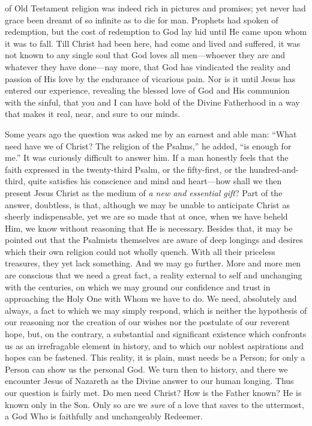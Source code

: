 \documentclass[12pt,a5paper,oneside]{book}
\begin{document}
of Old Testament religion was indeed rich in
pictures and promises; yet never had grace
been dreamt of so infinite as to die for man.
Prophets had spoken of redemption, but the
cost of redemption to God lay hid until He
came upon whom it was to fall. Till Christ
had been here, had come and lived and
suffered, it was not known to any single
soul that God loves all men---whoever
they are and whatever they have done---nay 
more, that God has vindicated the reality
and passion of His love by the endurance of
vicarious pain. Nor is it until Jesus has
entered our experience, revealing the blessed
love of God and His communion with the
sinful, that you and I can have hold of the
Divine Fatherhood in a way that makes it
real, near, and sure to our minds.

Some years ago the question was asked me
by an earnest and able man: ``What need have
we of Christ? The religion of the Psalms,''
he added, ``is enough for me.'' It was curiously
difficult to answer him. If a man honestly
feels that the faith expressed in the
twenty-third Psalm, or the fifty-first, or the
hundred-and-third, quite satisfies his conscience 
and mind and heart---how shall we
then present Jesus Christ as the medium of
\textit{a new and essential gift}? Part of the answer,
doubtless, is that, although we may be
unable to anticipate Christ as sheerly
indispensable, yet we are so made that
at once, when we have beheld Him, we
know without reasoning that He is necessary.
Besides that, it may be pointed out that
the Psalmists themselves are aware of deep
longings and desires which their own
religion could not wholly quench. With all
their priceless treasures, they yet lack something. 
And we may go further. More and more
men are conscious that we need a great fact,
a reality external to self and unchanging with
the centuries, on which we may ground our
confidence and trust in approaching the Holy
One with Whom we have to do. We need,
absolutely and always, a fact to which we
may simply respond, which is neither the hypothesis 
of our reasoning nor the creation of our
wishes nor the postulate of our reverent
hope, but, on the contrary, a substantial and
significant existence which confronts us as an
irrefragable element in history, and to which
our noblest aspirations and hopes can be
fastened. This reality, it is plain, must needs
be a Person; for only a Person can show
us the personal God. We turn then to
history, and there we encounter Jesus of
Nazareth as the Divine answer to our
human longing. Thus our question is fairly
met. Do men need Christ? How is the
Father known? He is known only in the Son.
Only so are we \textit{sure} of a love that saves to the
uttermost, a God Who is faithfully and unchangeably 
Redeemer.
\end{document}
